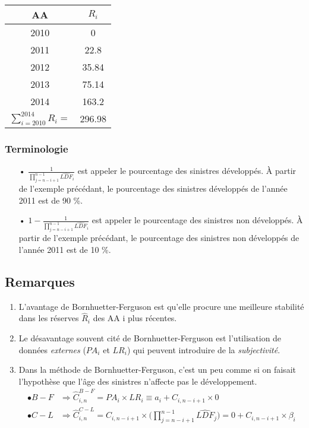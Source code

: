 \begin{center}
\begin{tabular}{|c|c|}
  \hline
   AA & $R_i$  \\
  \hline
  2010 & 0 \\
  2011 & 22.8 \\
  2012 & 35.84 \\
  2013 & 75.14 \\
  2014 & 163.2 \\
  \hline
  \hline
  $\sum_{i = 2010}^{2014} R_i = $   & 296.98 \\
  \hline
\end{tabular}
\end{center}
\subsubsection*{Terminologie}
\begin{itemize}
\item[•] $\frac{1}{\prod_{j = n - i + 1}^{n - 1} \widehat{LDF}_i}$ est appeler le pourcentage des sinistres développés. 
À partir de l'exemple précédant, le pourcentage des sinistres développés de l'année 2011 est de 90 \%.
\item[•] $1 - \frac{1}{\prod_{j = n - i + 1}^{n - 1} \widehat{LDF}_i}$ est appeler le pourcentage des sinistres non développés. 
À partir de l'exemple précédant, le pourcentage des sinistres non développés de l'année 2011 est de 10 \%.
\end{itemize}

\subsection*{Remarques}
\begin{enumerate}
\item L'avantage de Bornhuetter-Ferguson est qu'elle procure une meilleure stabilité dans les réserves $\widehat{R}_i$ des AA i plus récentes.
\item Le désavantage souvent cité de Bornhuetter-Ferguson est l'utilisation de données \emph{externes} ($PA_i$ et $LR_i$) qui peuvent introduire de la \emph{subjectivité}.
\item Dans la méthode de Bornhuetter-Ferguson, c'est un peu comme si on faisait l'hypothèse que l'âge des sinistres n'affecte pas le développement.
\begin{align*}
\bullet B-F &\Rightarrow \widehat{C}_{i,n}^{B-F} = PA_i \times LR_i \equiv a_i + C_{i,n-i+1} \times 0 \\
\bullet C-L &\Rightarrow \widehat{C}_{i,n}^{C-L} = C_{i,n-i+1} \times \Big(\prod_{j=n-i+1}^{n-1} \widehat{LDF}_j \Big) = 0 + C_{i,n-i+1} \times \beta_i \\
\end{align*}
\end{enumerate}


